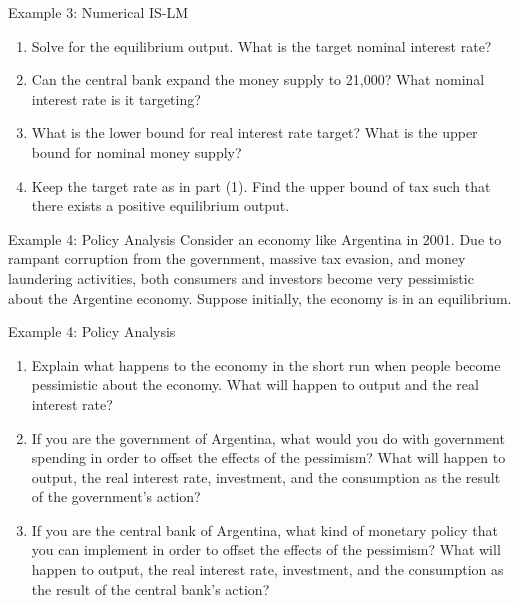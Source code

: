 \documentclass[xcolor=dvipsnames]{beamer}
\begin{document}
\begin{frame}{Example 3: Numerical IS-LM}
    \begin{enumerate}
        \item Solve for the equilibrium output. What is the target nominal interest rate?
        \item Can the central bank expand the money supply to 21,000? What nominal interest rate is it targeting?
        \item What is the lower bound for real interest rate target? What is the upper bound for nominal money supply?
        \item Keep the target rate as in part (1). Find the upper bound of tax such that there exists a positive equilibrium output.
    \end{enumerate}
\end{frame}

\begin{frame}{Example 4: Policy Analysis}
    Consider an economy like Argentina in 2001. Due to rampant corruption from the government, massive tax evasion, and money laundering activities, both consumers and investors become very pessimistic about the Argentine economy. Suppose initially, the economy is in an equilibrium. 
\end{frame}

\begin{frame}{Example 4: Policy Analysis}
    \begin{enumerate}
        \item Explain what happens to the economy in the short run when people become pessimistic about the economy. What will happen to output and the real interest rate?
        \item If you are the government of Argentina, what would you do with government spending in order to offset the effects of the pessimism? What will happen to output, the real interest rate, investment, and the consumption as the result of the government's action?
        \item If you are the central bank of Argentina, what kind of monetary policy that you can implement in order to offset the effects of the pessimism? What will happen to output, the real interest rate, investment, and the consumption as the result of the central bank's action?
    \end{enumerate}
\end{frame}
\end{document}
